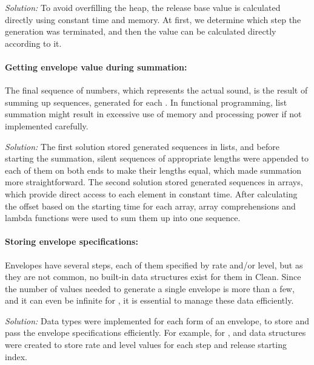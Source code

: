 \documentclass[runningheads]{llncs}
\begin{document}
\textit{Solution:} To avoid overfilling the heap, the release base value is calculated directly using constant time and memory. At first, we determine which step the generation was terminated, and then the value can be calculated directly according to it.

\paragraph{\textbf{Getting envelope value during summation:}} The final sequence of numbers, which represents the actual sound, is the result of summing up sequences, generated for each . In functional programming, list summation might result in excessive use of memory and processing power if not implemented carefully.

\textit{Solution:} The first solution stored generated sequences in lists, and before starting the summation, silent sequences of appropriate lengths were appended to each of them on both ends to make their lengths equal, which made summation more straightforward. The second solution stored generated sequences in arrays, which provide direct access to each element in constant time. After calculating the offset based on the starting time for each array, array comprehensions and lambda functions were used to sum them up into one sequence.

\paragraph{\textbf{Storing envelope specifications:}} Envelopes have several steps, each of them specified by rate and/or level, but as they are not common, no built-in data structures exist for them in Clean. Since the number of values needed to generate a single envelope is more than a few, and it can even be infinite for , it is essential to manage these data efficiently.

\textit{Solution:} Data types were implemented for each form of an envelope, to store and pass the envelope specifications efficiently. For example, for ,  and  data structures were created to store rate and level values for each step and release starting index. 
\end{document}
